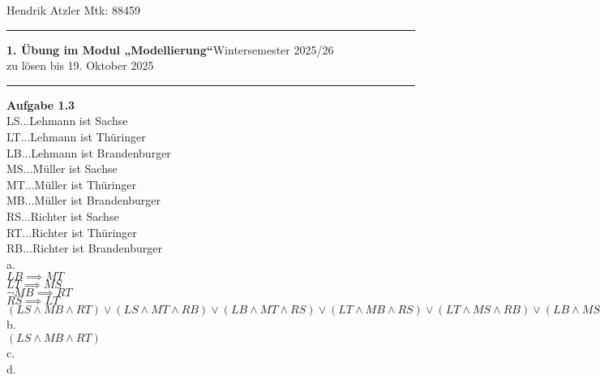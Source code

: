 \documentclass[a4paper,12pt]{article}
\begin{document}
Hendrik Atzler \hfill Mtk: 88459

\rule{\textwidth}{0.4pt}


{\textbf{1. Übung im Modul „Modellierung“}\hfill Wintersemester 2025/26} \\
zu lösen bis 19. Oktober 2025 \\
\rule{\textwidth}{0.4pt}

{\large{\textbf{Aufgabe 1.3}}} \\

LS...Lehmann ist Sachse \\
LT...Lehmann ist Thüringer \\
LB...Lehmann ist Brandenburger \\
MS...Müller ist Sachse \\
MT...Müller ist Thüringer \\
MB...Müller ist Brandenburger \\
RS...Richter ist Sachse \\
RT...Richter ist Thüringer \\
RB...Richter ist Brandenburger \\

a.\\ 
$ LB \implies MT $ \\
$ LT \implies MS $ \\
$ \neg MB \implies RT $ \\
$  RS \implies LT $ \\

$ (LS \land MB \land RT) \lor (LS \land MT \land RB) \lor (LB \land MT \land RS) \lor (LT \land MB \land RS) \lor (LT \land MS \land RB) \lor (LB \land MS \land RT) $ \\

b. \\
$ (LS \land MB \land RT) $ \\

c. \\


d. \\
\end{document}
